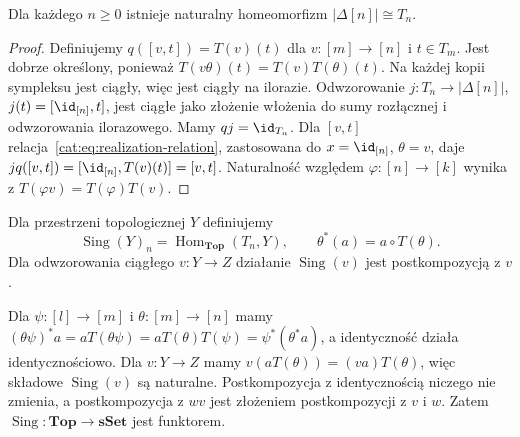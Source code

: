 \begin{stwierdzenie}\label{cat:prop:realization-standard-simplex}
Dla każdego $n\geq0$ istnieje naturalny homeomorfizm $|\Delta[n]|\cong T_n$.
\end{stwierdzenie}
\begin{proof}
Definiujemy $q([v,t])=T(v)(t)$ dla $v:[m]\to[n]$ i $t\in T_m$. Jest dobrze określony, ponieważ $T(v\theta)(t)=T(v)T(\theta)(t)$. Na każdej kopii sympleksu jest ciągły, więc jest ciągły na ilorazie. Odwzorowanie $j:T_n\to|\Delta[n]|$, $j(t)=[\id_{[n]},t]$, jest ciągłe jako złożenie włożenia do sumy rozłącznej i odwzorowania ilorazowego. Mamy $qj=\id_{T_n}$. Dla $[v,t]$ relacja~\eqref{cat:eq:realization-relation}, zastosowana do $x=\id_{[n]}$, $\theta=v$, daje $jq([v,t])=[\id_{[n]},T(v)(t)]=[v,t]$. Naturalność względem $\varphi:[n]\to[k]$ wynika z $T(\varphi v)=T(\varphi)T(v)$.
\end{proof}

\begin{definicja}\label{cat:def:singular-simplicial-set}
Dla przestrzeni topologicznej $Y$ definiujemy
\[
 \operatorname{Sing}(Y)_n=\operatorname{Hom}_{\mathbf{Top}}(T_n,Y),
 \qquad
 \theta^*(a)=a\circ T(\theta).
\]
Dla odwzorowania ciągłego $v:Y\to Z$ działanie $\operatorname{Sing}(v)$ jest postkompozycją z $v$.
\end{definicja}
Dla $\psi:[l]\to[m]$ i $\theta:[m]\to[n]$ mamy $(\theta\psi)^*a=aT(\theta\psi)=aT(\theta)T(\psi)=\psi^*(\theta^*a)$, a identyczność działa identycznościowo. Dla $v:Y\to Z$ mamy $v(aT(\theta))=(va)T(\theta)$, więc składowe $\operatorname{Sing}(v)$ są naturalne. Postkompozycja z identycznością niczego nie zmienia, a postkompozycja z $wv$ jest złożeniem postkompozycji z $v$ i $w$. Zatem $\operatorname{Sing}:\mathbf{Top}\to\mathbf{sSet}$ jest funktorem.

